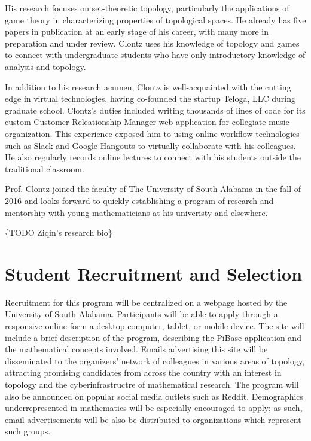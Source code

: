     His research focuses on set-theoretic topology, particularly the applications
    of game theory in characterizing properties of topological spaces.
    He already has five papers in publication at an early stage of his career,
    with many more in preparation and under review. Clontz uses his knowledge
    of topology and games to connect with undergraduate
    students who have only introductory knowledge of analysis and topology.

    In addition to his research acumen, Clontz is well-acquainted with
    the cutting edge in virtual technologies, having co-founded the startup
    Teloga, LLC during graduate school. Clontz's duties included writing
    thousands of lines of code for its custom Customer Releationship
    Manager web application for collegiate music organization. This experience
    exposed him to using online workflow technologies such as Slack and Google
    Hangouts to virtually collaborate with his colleagues. He also regularly
    records online lectures to connect with his students outside the
    traditional classroom.

    Prof. Clontz joined the faculty of The University of South Alabama
    in the fall of 2016 and looks forward to quickly establishing a program
    of research and mentorship with young mathematicians at his univeristy
    and elsewhere.

  \{TODO Ziqin's research bio\}

\section{Student Recruitment and Selection}

  Recruitment for this program will be centralized on a webpage hosted
  by the University of South Alabama. Participants will be able to apply
  through a responsive online form a desktop computer, tablet, or mobile device.
  The site will include a brief description of the program, describing the
  PiBase application and the mathematical concepts involved.
  Emails advertising this site will be disseminated to the organizers'
  network of colleagues in various areas of
  topology, attracting promising candidates from across
  the country with an interest in topology and the cyberinfrastructre of
  mathematical research. The program will also be announced on popular social
  media outlets such as Reddit. Demographics underrepresented in mathematics
  will be especially encouraged to apply; as such, email advertisements
  will be also be distributed to organizations which represent such groups.

